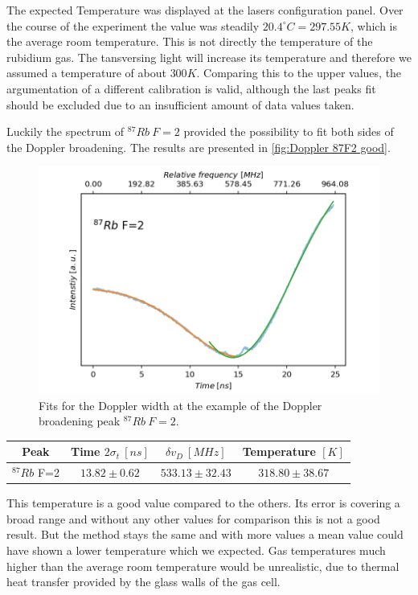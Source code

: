 \documentclass[]{article}
\begin{document}
The expected Temperature was displayed at the lasers configuration panel. Over the course of the experiment the value was steadily $20.4^\circ C = 297.55 K$, which is the average room temperature. This is not directly the temperature of the rubidium gas. The tansversing light will increase its temperature and therefore we assumed a temperature of about $300K$. Comparing this to the upper values, the argumentation of a different calibration is valid, although the last peaks fit should be excluded due to an insufficient amount of data values taken.

Luckily the spectrum of $^{87}Rb\ F=2$ provided the possibility to fit both sides of the Doppler broadening. The results are presented in \autoref{fig:Doppler 87F2 good}.

\begin{figure}[H]
\centering
\includegraphics[width=.8\textwidth]{Plots/Doppler_87F2.png}
\caption{Fits for the Doppler width at the example of the Doppler broadening peak $^{87}Rb\ F=2$.}
\label{fig:Doppler 87F2 good}
\end{figure}

\begin{table}[H]
\centering
\begin{tabular}{|c|c|c|c|}
\hline
Peak & Time $2\sigma_t\ [ns]$ & $\delta v_D\ [MHz]$ & Temperature $[K]$ \\ \hline\hline
$^{87}Rb$ F=2 & $13.82 \pm 0.62$  & $533.13 \pm 32.43$ & $318.80 \pm 38.67$   \\ \hline
\hline
\end{tabular}
\end{table}

This temperature is a good value compared to the others. Its error is covering a broad range and without any other values for comparison this is not a good result. But the method stays the same and with more values a mean value could have shown a lower temperature which we expected. Gas temperatures much higher than the average room temperature would be unrealistic, due to thermal heat transfer provided by the glass walls of the gas cell.
\end{document}
